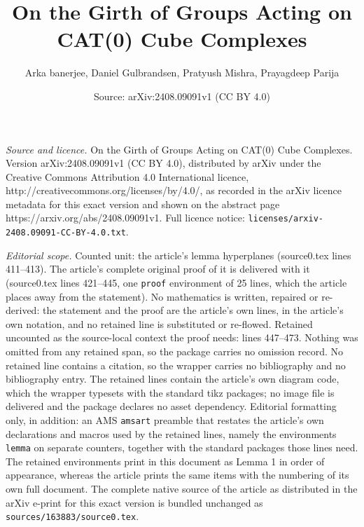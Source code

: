 \documentclass[10pt,a4paper]{amsart}
\title{On the Girth of Groups Acting on CAT(0) Cube Complexes}
\author{Arka banerjee, Daniel Gulbrandsen, Pratyush Mishra, Prayagdeep Parija}
\date{Source: arXiv:2408.09091v1 (CC BY 4.0)}
\begin{document}
\maketitle

\noindent\emph{Source and licence.} On the Girth of Groups Acting on CAT(0) Cube Complexes. Version arXiv:2408.09091v1 (CC BY 4.0), distributed by arXiv under the Creative Commons Attribution 4.0 International licence, http://creativecommons.org/licenses/by/4.0/, as recorded in the arXiv licence metadata for this exact version and shown on the abstract page https://arxiv.org/abs/2408.09091v1. Full licence notice: \texttt{licenses/arxiv-2408.09091-CC-BY-4.0.txt}.\par\smallskip

\noindent\textit{Editorial scope.} Counted unit: the article's lemma hyperplanes (source0.tex lines 411--413). The article's complete original proof of it is delivered with it (source0.tex lines 421--445, one \texttt{proof} environment of 25 lines, which the article places away from the statement). No mathematics is written, repaired or re-derived: the statement and the proof are the article's own lines, in the article's own notation, and no retained line is substituted or re-flowed.  Retained uncounted as the source-local context the proof needs: lines 447--473.  Nothing was omitted from any retained span, so the package carries no omission record.  No retained line contains a citation, so the wrapper carries no bibliography and no bibliography entry.  The retained lines contain the article's own diagram code, which the wrapper typesets with the standard tikz packages; no image file is delivered and the package declares no asset dependency.  Editorial formatting only, in addition: an AMS \texttt{amsart} preamble that restates the article's own declarations and macros used by the retained lines, namely the environments \texttt{lemma} on separate counters, together with the standard packages those lines need.  The retained environments print in this document as Lemma 1 in order of appearance, whereas the article prints the same items with the numbering of its own full document.  The complete native source of the article as distributed in the arXiv e-print for this exact version is bundled unchanged as \texttt{sources/163883/source0.tex}.
\end{document}
